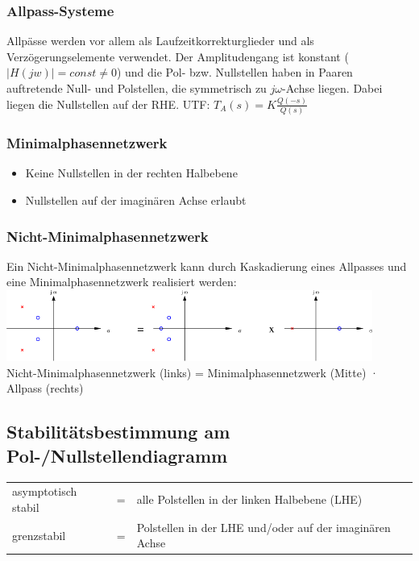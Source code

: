 \subsubsection{Allpass-Systeme}
Allpässe werden vor allem als Laufzeitkorrekturglieder und als
Verzögerungselemente verwendet. Der Amplitudengang ist konstant ($|H(jw)| =
const \neq 0$) und die Pol- bzw. Nullstellen haben in Paaren auftretende Null-
und Polstellen, die symmetrisch zu $j \omega$-Achse liegen. Dabei liegen die
Nullstellen auf der RHE.
UTF: $T_A(s) = K
\frac{Q(-s)}{Q(s)}$



\subsubsection{Minimalphasennetzwerk}
\begin{itemize}
  \item Keine Nullstellen in der rechten Halbebene
  \item Nullstellen auf der imaginären Achse erlaubt
\end{itemize}


\subsubsection{Nicht-Minimalphasennetzwerk}
Ein Nicht-Minimalphasennetzwerk kann durch Kaskadierung eines Allpasses und
eine Minimalphasennetzwerk realisiert werden:\\
\includegraphics[width=12cm]{./bilder/nicht-minimalphasennetzwerk.png}\\
Nicht-Minimalphasennetzwerk (links) = Minimalphasennetzwerk (Mitte) · Allpass (rechts)

\subsection{Stabilitätsbestimmung am Pol-/Nullstellendiagramm}
\begin{tabular}{lcl}
	asymptotisch stabil & = & alle Polstellen in der linken Halbebene (LHE) \\
	grenzstabil			& = & Polstellen in der LHE und/oder auf der imaginären Achse
\end{tabular}


